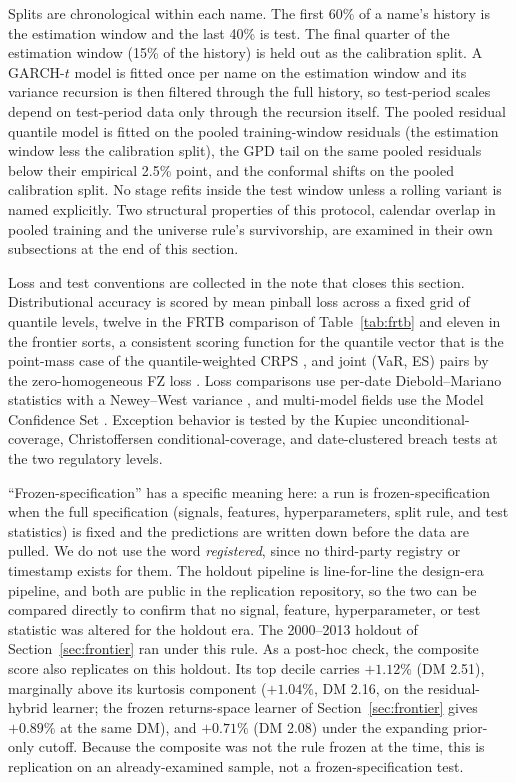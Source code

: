 \documentclass[11pt]{article}
\theoremstyle{remark}
\begin{document}
Splits are chronological within each name. The first 60\% of a name's
history is the estimation window and the last 40\% is test. The final
quarter of the estimation window (15\% of the history) is held out as
the calibration split. A GARCH-$t$ model is fitted once per name on
the estimation window and its variance recursion is then filtered
through the full history, so test-period scales depend on test-period
data only through the recursion itself. The pooled residual quantile
model is fitted on the pooled training-window residuals (the estimation window less the calibration split), the GPD tail on
the same pooled residuals below their empirical 2.5\% point, and the
conformal shifts on the pooled calibration split. No stage refits
inside the test window unless a rolling variant is named explicitly.
Two structural properties of this protocol, calendar overlap in
pooled training and the universe rule's survivorship, are examined in
their own subsections at the end of this section.

Loss and test conventions are collected in the note that closes this section. Distributional accuracy is scored by mean pinball loss across a fixed grid of quantile levels, twelve in the FRTB comparison of Table~\ref{tab:frtb} and eleven in the frontier sorts, a consistent scoring function for the quantile vector that is the point-mass case of the quantile-weighted CRPS \citep{gneitingranjan2011}, and joint (VaR, ES) pairs by the zero-homogeneous FZ loss \citep{fissler2016,patton2019}. Loss comparisons use per-date Diebold--Mariano statistics \citep{dieboldmariano1995} with a Newey--West variance \citep{neweywest1987}, and multi-model fields use the Model Confidence Set \citep{hansen2011mcs}. Exception behavior is tested by the Kupiec unconditional-coverage, Christoffersen conditional-coverage, and date-clustered breach tests at the two regulatory levels.

``Frozen-specification'' has a specific meaning here: a run is
frozen-specification when the full specification (signals, features,
hyperparameters, split rule, and test statistics) is fixed and the
predictions are written down before the data are pulled. We do not use
the word \emph{registered}, since no third-party registry or timestamp
exists for them. The holdout pipeline is line-for-line the
design-era pipeline, and both are public in the replication
repository, so the two can be compared directly to confirm that no signal,
feature, hyperparameter, or test statistic was altered for the holdout
era. The
2000--2013 holdout of Section~\ref{sec:frontier} ran under this rule. As
a post-hoc check, the composite score also replicates on this holdout.
Its top decile carries $+1.12\%$ (DM 2.51), marginally above its kurtosis
component ($+1.04\%$, DM 2.16, on the residual-hybrid learner; the frozen returns-space learner of Section~\ref{sec:frontier} gives $+0.89\%$ at the same DM), and $+0.71\%$ (DM 2.08) under the
expanding prior-only cutoff. Because the composite was not the rule frozen at the time, this is replication on an already-examined sample, not a frozen-specification test.
\end{document}
